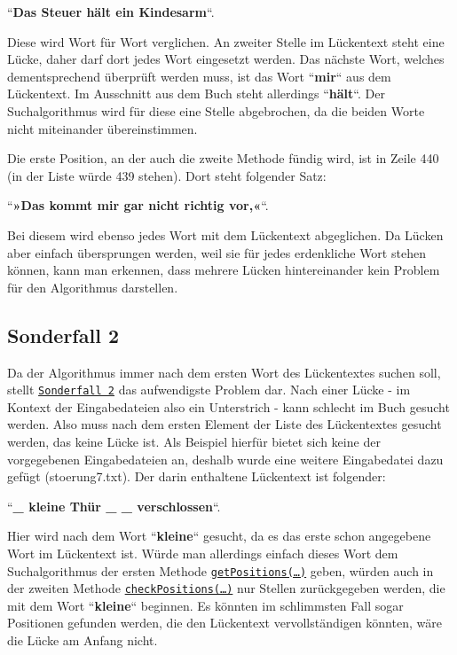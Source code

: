 \documentclass[a4paper, 10pt, ngerman]{scrartcl}
\begin{document}
``\textbf{Das Steuer hält ein Kindesarm}``.

Diese wird Wort für Wort verglichen.
An zweiter Stelle im Lückentext steht eine Lücke,
daher darf dort jedes Wort eingesetzt werden.
Das nächste Wort,
welches dementsprechend überprüft werden muss,
ist das Wort ``\textbf{mir}`` aus dem Lückentext.
Im Ausschnitt aus dem Buch steht allerdings ``\textbf{hält}``.
Der Suchalgorithmus wird für diese eine Stelle abgebrochen,
da die beiden Worte nicht miteinander übereinstimmen.

Die erste Position,
an der auch die zweite Methode fündig wird,
ist in Zeile 440
(in der Liste würde 439 stehen).
Dort steht folgender Satz:

``\textbf{»Das kommt mir gar nicht richtig vor,«}``.

Bei diesem wird ebenso jedes Wort mit dem Lückentext abgeglichen.
Da Lücken aber einfach übersprungen werden,
weil sie für jedes erdenkliche Wort stehen können,
kann man erkennen,
dass mehrere Lücken hintereinander kein Problem für den Algorithmus darstellen.

\subsection{Sonderfall 2}\label{sec:zweiterSonderfall}
Da der Algorithmus immer nach dem ersten Wort des Lückentextes suchen soll,
stellt \hyperref[sonderfallZwei]{\texttt{Sonderfall 2}} das aufwendigste Problem dar.
Nach einer Lücke
- im Kontext der Eingabedateien also ein Unterstrich -
kann schlecht im Buch gesucht werden.
Also muss nach dem ersten Element der Liste des Lückentextes gesucht werden,
das keine Lücke ist.
Als Beispiel hierfür bietet sich keine der vorgegebenen Eingabedateien an,
deshalb wurde eine weitere Eingabedatei dazu gefügt
(stoerung7.txt).
Der darin enthaltene Lückentext ist folgender:

``\textbf{\_ kleine Thür \_ \_ verschlossen}``.

Hier wird nach dem Wort ``\textbf{kleine}`` gesucht,
da es das erste schon angegebene Wort im Lückentext ist.
Würde man allerdings einfach dieses Wort dem Suchalgorithmus der ersten Methode \hyperref[sec:getPositions()]{\texttt{getPositions(\ldots)}} geben,
würden auch in der zweiten Methode \hyperref[sec:checkPositions()]{\texttt{checkPositions(\ldots)}} nur Stellen zurückgegeben werden,
die mit dem Wort ``\textbf{kleine}`` beginnen.
Es könnten im schlimmsten Fall sogar Positionen gefunden werden,
die den Lückentext vervollständigen könnten,
wäre die Lücke am Anfang nicht.
\end{document}
